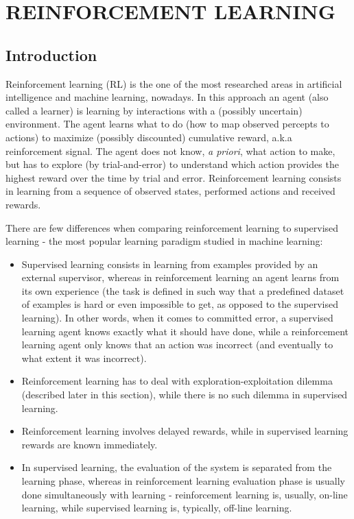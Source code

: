 \chapter{REINFORCEMENT LEARNING}
\thispagestyle{fancy}


	\section{Introduction}
        Reinforcement learning (RL) is the one of the most researched areas in artificial intelligence and
        machine learning, nowadays. In this approach an agent (also called a learner) is learning by interactions with a (possibly uncertain) environment. The agent learns what to do (how to map observed percepts to actions) to maximize (possibly discounted) cumulative reward, a.k.a reinforcement signal. The agent does not know, \textit{a priori}, what action to make, but has to explore (by trial-and-error) to understand which action provides the highest reward over the time by trial and error. Reinforcement learning consists in learning from a sequence of observed states, performed actions and received rewards.
		\par
		There are few differences when comparing reinforcement learning to supervised learning - the most popular learning paradigm studied in machine learning:
		\begin{itemize}
		    \item Supervised learning consists in learning from examples provided by an external supervisor, whereas in reinforcement learning an agent learns from its own experience (the task is defined in such way that a predefined dataset of examples is hard or even impossible to get, as opposed to the supervised learning). In other words, when it comes to committed error, a supervised learning agent knows exactly what it should have done, while a reinforcement learning agent only knows that an action was incorrect (and eventually to what extent it was incorrect).
		    \item Reinforcement learning has to deal with exploration-exploitation dilemma (described later in this section), while there is no such dilemma in supervised learning.
		    \item Reinforcement learning involves delayed rewards, while in supervised learning rewards are known immediately.
		    \item In supervised learning, the evaluation of the system is separated from the learning phase, whereas in reinforcement learning evaluation phase is usually done simultaneously with learning - reinforcement learning is, usually, on-line learning, while supervised learning is, typically, off-line learning.
		\end{itemize}
		
